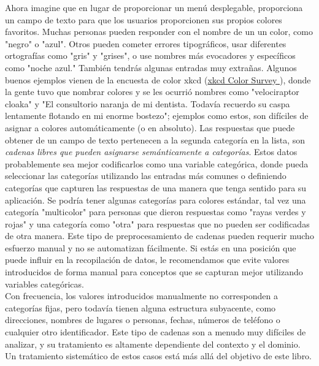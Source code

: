 Ahora imagine que en lugar de proporcionar un menú desplegable, proporciona un campo de texto para que los 
usuarios  proporcionen sus propios colores favoritos. Muchas personas pueden responder con el nombre de un un color, como "{}negro"{} o "{}azul"{}. Otros pueden cometer errores tipográficos, usar diferentes
ortografías como "{}gris"{} y "{}grises"{}, o use nombres más evocadores y específicos como "{}noche azul."{} También tendrás algunas entradas muy extrañas.  Algunos buenos ejemplos vienen
de la encuesta de color xkcd  (\href{https://blog.xkcd.com/2010/05/03/color-survey-results/}{\textcolor{vino}{xkcd Color Survey} }), donde la gente tuvo que nombrar colores y se les ocurrió nombres como "{}velociraptor cloaka"{}    y   "{}El consultorio  naranja de mi dentista.  Todavía recuerdo su  caspa lentamente flotando en mi enorme bostezo"{}; ejemplos como estos,  son difíciles de asignar a colores automáticamente (o en absoluto).   Las respuestas que puede obtener de un campo de texto pertenecen a la segunda categoría en la lista, son  \emph{cadenas libres que pueden asignarse semánticamente a categorías}. 
Estos datos probablemente sea mejor codificarlos  como una variable categórica, donde pueda 
seleccionar las categorías utilizando las entradas más comunes o definiendo categorías que capturen las respuestas de una manera que tenga sentido para su aplicación.  Se podría tener algunas categorías para colores estándar, tal vez una categoría  "{}multicolor"{}   para personas que dieron respuestas como  "{}rayas verdes y rojas"{}  y una   categoría  como  "{}otra"{}  para respuestas que no pueden ser codificadas de otra manera. 
 Este tipo de preprocesamiento de  cadenas pueden requerir mucho esfuerzo manual y no se automatizan fácilmente.  Si estás en una posición que  puede influir en la recopilación de datos, le recomendamos que evite valores introducidos de forma manual para conceptos que se capturan mejor utilizando variables categóricas.\\


Con frecuencia, los valores introducidos manualmente no corresponden a categorías fijas, pero todavía tienen alguna estructura subyacente, como direcciones, nombres de lugares o personas, fechas, números de teléfono o cualquier otro identificador. Este tipo de cadenas son a menudo muy difíciles de analizar, y su tratamiento es altamente dependiente del contexto y el dominio. Un tratamiento sistemático de estos casos está más allá del objetivo de este libro.\\



